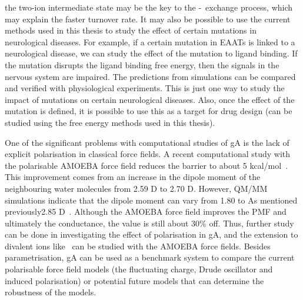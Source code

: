 the two-ion intermediate state may be the key to the \K-\Na\ exchange process, which may 
explain the faster turnover rate. It may also be possible to use the current methods used in 
this thesis to study the effect of certain mutations in neurological diseases. For example, 
if a certain mutation in EAATs is linked to a neurological disease, we can study the effect 
of the mutation to ligand binding. If the mutation disrupts the ligand binding free energy, 
then the signals in the nervous system are impaired. The predictions from simulations can be 
compared and verified with physiological experiments. This is just one way to study the impact 
of mutations on certain neurological diseases. Also, once the effect of the mutation is 
defined, it is possible to use this as a target for drug design (can be studied using 
the free energy methods used in this thesis).

One of the significant problems with computational studies of gA is the lack of explicit 
polarisation in classical force fields. A recent computational study with the polarisable 
AMOEBA force field reduces the barrier to about 5 kcal/mol~\cite{Peng2016}. This improvement 
comes from an increase in the dipole moment of the neighbouring water molecules from 2.59 D 
to 2.70 D. However, QM/MM simulations indicate that the dipole moment can vary from 1.80 to 
As mentioned previously2.85 D~\cite{Timko2012}. Although the AMOEBA force field improves the 
PMF and ultimately the conductance, the value is still about 30\% off. Thus, further study 
can be done in investigating the effect of polarisation in gA, and the extension to divalent 
ions like \Ca\ can be studied with the AMOEBA force fields. Besides parametrisation, gA can 
be used as a benchmark system to compare the current polarisable force field models (the fluctuating 
charge, Drude oscillator and induced polarisation) or potential future models  that can determine 
the robustness of the models.

